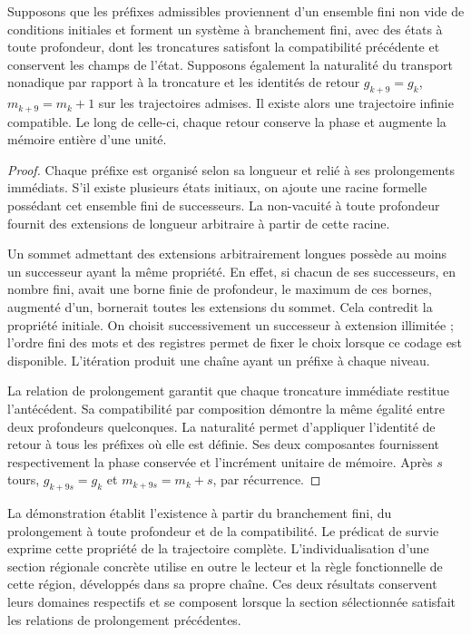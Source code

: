 \begin{theorem}
Supposons que les préfixes admissibles proviennent d’un ensemble fini non vide de conditions initiales et forment un système à branchement fini, avec des états à toute profondeur, dont les troncatures satisfont la compatibilité précédente et conservent les champs de l’état. Supposons également la naturalité du transport nonadique par rapport à la troncature et les identités de retour $g_{k+9}=g_k$, $m_{k+9}=m_k+1$ sur les trajectoires admises. Il existe alors une trajectoire infinie compatible. Le long de celle-ci, chaque retour conserve la phase et augmente la mémoire entière d’une unité.
\end{theorem}
\begin{proof}
Chaque préfixe est organisé selon sa longueur et relié à ses prolongements immédiats. S’il existe plusieurs états initiaux, on ajoute une racine formelle possédant cet ensemble fini de successeurs. La non-vacuité à toute profondeur fournit des extensions de longueur arbitraire à partir de cette racine.

Un sommet admettant des extensions arbitrairement longues possède au moins un successeur ayant la même propriété. En effet, si chacun de ses successeurs, en nombre fini, avait une borne finie de profondeur, le maximum de ces bornes, augmenté d’un, bornerait toutes les extensions du sommet. Cela contredit la propriété initiale. On choisit successivement un successeur à extension illimitée ; l’ordre fini des mots et des registres permet de fixer le choix lorsque ce codage est disponible. L’itération produit une chaîne ayant un préfixe à chaque niveau.

La relation de prolongement garantit que chaque troncature immédiate restitue l’antécédent. Sa compatibilité par composition démontre la même égalité entre deux profondeurs quelconques. La naturalité permet d’appliquer l’identité de retour à tous les préfixes où elle est définie. Ses deux composantes fournissent respectivement la phase conservée et l’incrément unitaire de mémoire. Après $s$ tours, $g_{k+9s}=g_k$ et $m_{k+9s}=m_k+s$, par récurrence.
\end{proof}

La démonstration établit l’existence à partir du branchement fini, du prolongement à toute profondeur et de la compatibilité. Le prédicat de survie exprime cette propriété de la trajectoire complète. L’individualisation d’une section régionale concrète utilise en outre le lecteur et la règle fonctionnelle de cette région, développés dans sa propre chaîne. Ces deux résultats conservent leurs domaines respectifs et se composent lorsque la section sélectionnée satisfait les relations de prolongement précédentes.

